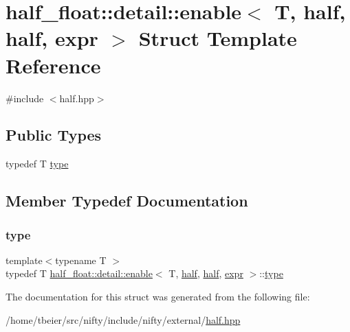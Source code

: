\hypertarget{structhalf__float_1_1detail_1_1enable_3_01T_00_01half_00_01half_00_01expr_01_4}{}\section{half\+\_\+float\+:\+:detail\+:\+:enable$<$ T, half, half, expr $>$ Struct Template Reference}
\label{structhalf__float_1_1detail_1_1enable_3_01T_00_01half_00_01half_00_01expr_01_4}


{\ttfamily \#include $<$half.\+hpp$>$}

\subsection*{Public Types}
\begin{DoxyCompactItemize}
\item 
typedef T \hyperlink{structhalf__float_1_1detail_1_1enable_3_01T_00_01half_00_01half_00_01expr_01_4_a25343bb79287a3bce7ff8611d4b40a47}{type}
\end{DoxyCompactItemize}


\subsection{Member Typedef Documentation}
\mbox{\label{structhalf__float_1_1detail_1_1enable_3_01T_00_01half_00_01half_00_01expr_01_4_a25343bb79287a3bce7ff8611d4b40a47}} 
\subsubsection{\texorpdfstring{type}{type}}
{\footnotesize\ttfamily template$<$typename T $>$ \\
typedef T \hyperlink{structhalf__float_1_1detail_1_1enable}{half\+\_\+float\+::detail\+::enable}$<$ T, \hyperlink{classhalf__float_1_1half}{half}, \hyperlink{classhalf__float_1_1half}{half}, \hyperlink{structhalf__float_1_1detail_1_1expr}{expr} $>$\+::\hyperlink{structhalf__float_1_1detail_1_1enable_3_01T_00_01half_00_01half_00_01expr_01_4_a25343bb79287a3bce7ff8611d4b40a47}{type}}



The documentation for this struct was generated from the following file\+:\begin{DoxyCompactItemize}
\item 
/home/tbeier/src/nifty/include/nifty/external/\hyperlink{half_8hpp}{half.\+hpp}\end{DoxyCompactItemize}
